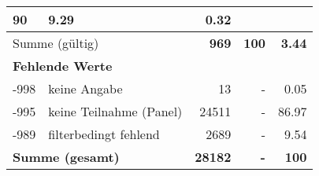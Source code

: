 \begin{longtable}{lXrrr}
       \num{90} &
       \num[round-mode=places,round-precision=2]{9,29} &
         \num[round-mode=places,round-precision=2]{0,32} \\
     \midrule
     \multicolumn{2}{l}{Summe (gültig)} &
       \textbf{\num{969}} &
     \textbf{100} &
       \textbf{\num[round-mode=places,round-precision=2]{3,44}} \\
     \multicolumn{5}{l}{\textbf{Fehlende Werte}}\\
       -998 &
       keine Angabe &
         \num{13} &
        - &
         \num[round-mode=places,round-precision=2]{0,05} \\
       -995 &
       keine Teilnahme (Panel) &
         \num{24511} &
        - &
         \num[round-mode=places,round-precision=2]{86,97} \\
       -989 &
       filterbedingt fehlend &
         \num{2689} &
        - &
         \num[round-mode=places,round-precision=2]{9,54} \\
     \midrule
     \multicolumn{2}{l}{\textbf{Summe (gesamt)}} &
          \textbf{\num{28182}} &
        \textbf{-} &
        \textbf{100} \\
     \bottomrule
     \end{longtable}
     
